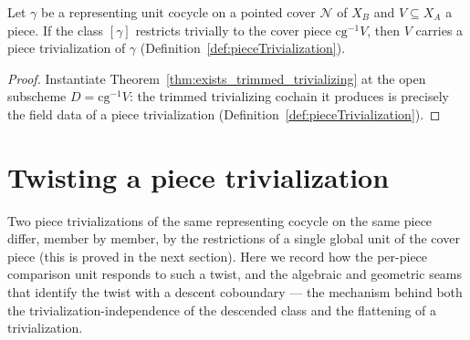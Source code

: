 \begin{theorem}
  \label{thm:pieceTrivialization_of_triv}
  \leanok
  Let \(\gamma\) be a representing unit cocycle on a pointed cover \(\mathcal N\) of \(X_B\) and \(V
  \subseteq X_A\) a piece. If the class \([\gamma]\) restricts trivially to the cover piece
  \(\mathrm{cg}^{-1}V\), then \(V\) carries a piece trivialization of \(\gamma\)
  (Definition~\ref{def:pieceTrivialization}).
\end{theorem}
\begin{proof}
  \leanok
  Instantiate Theorem~\ref{thm:exists_trimmed_trivializing} at the open subscheme \(D = \mathrm{cg}
  ^{-1}V\): the trimmed trivializing cochain it produces is precisely the field data of a piece
  trivialization (Definition~\ref{def:pieceTrivialization}).
\end{proof}

\section{Twisting a piece trivialization}
\label{sec:effectivityTwist}

Two piece trivializations of the same representing cocycle on the same piece differ, member by member,
by the restrictions of a single global unit of the cover piece (this is proved in the next section).
Here we record how the per-piece comparison unit responds to such a twist, and the algebraic and
geometric seams that identify the twist with a descent coboundary --- the mechanism behind both the
trivialization-independence of the descended class and the flattening of a trivialization.


